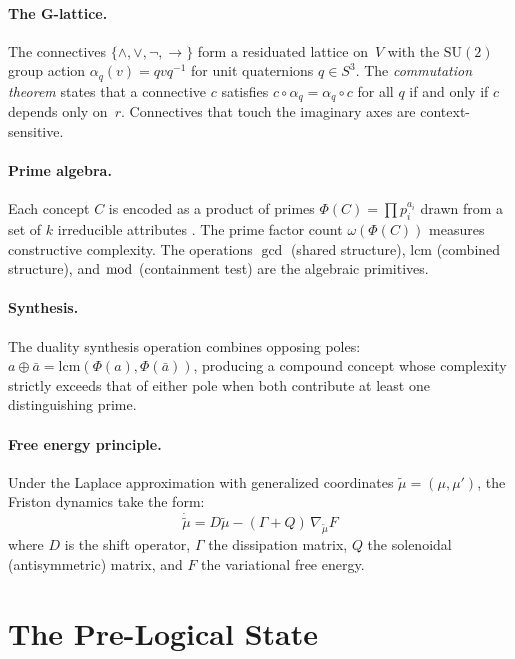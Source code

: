 \documentclass[11pt,a4paper]{article}
\begin{document}
\paragraph{The G-lattice.}
The connectives $\{\wedge, \vee, \neg, \to\}$ form a residuated lattice
on~$V$ with the $\mathrm{SU}(2)$ group action
$\alpha_q(v) = qvq^{-1}$ for unit quaternions $q \in S^3$. The
\emph{commutation theorem} \citep{p11} states that a connective $c$
satisfies $c \circ \alpha_q = \alpha_q \circ c$ for all $q$ if and only
if $c$ depends only on~$r$. Connectives that touch the imaginary axes
are context-sensitive.

\paragraph{Prime algebra.}
Each concept $C$ is encoded as a product of primes
$\Phi(C) = \prod p_i^{a_i}$ drawn from a set of $k$ irreducible
attributes \citep{p1}. The prime factor count
$\omega(\Phi(C))$ measures constructive complexity. The operations
$\gcd$ (shared structure), $\mathrm{lcm}$ (combined structure), and
$\bmod$ (containment test) are the algebraic primitives.

\paragraph{Synthesis.}
The duality synthesis operation \citep{p12} combines opposing poles:
$a \oplus \bar{a} = \mathrm{lcm}(\Phi(a), \Phi(\bar{a}))$, producing
a compound concept whose complexity strictly exceeds that of either pole
when both contribute at least one distinguishing prime.

\paragraph{Free energy principle.}
Under the Laplace approximation with generalized coordinates
$\tilde{\mu} = (\mu, \mu')$, the Friston dynamics
\citep{friston2010,buckley2017} take the form:
\begin{equation}
\label{eq:friston}
\dot{\tilde{\mu}} = D\tilde{\mu}
  - (\Gamma + Q)\,\nabla_{\tilde{\mu}} F
\end{equation}
where $D$ is the shift operator, $\Gamma$ the dissipation matrix, $Q$
the solenoidal (antisymmetric) matrix, and $F$ the variational free
energy.

\section{The Pre-Logical State}
\label{sec:prelogical}
\end{document}
